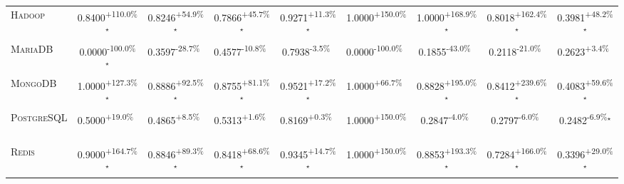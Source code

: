 \begin{table}[htbp]
\begin{tabular}{l|cccc|cccc}
\textsc{Hadoop} & \cellcolor{green!30}0.8400\textsuperscript{+110.0\%}$^\star$ & \cellcolor{green!30}0.8246\textsuperscript{+54.9\%}$^\star$ & \cellcolor{green!30}0.7866\textsuperscript{+45.7\%}$^\star$ & \cellcolor{green!30}0.9271\textsuperscript{+11.3\%}$^\star$ & \cellcolor{green!30}1.0000\textsuperscript{+150.0\%}$^{\,\,\,}$ & \cellcolor{green!30}1.0000\textsuperscript{+168.9\%}$^\star$ & \cellcolor{green!30}0.8018\textsuperscript{+162.4\%}$^\star$ & \cellcolor{green!30}0.3981\textsuperscript{+48.2\%}$^\star$ \\
\textsc{MariaDB} & \cellcolor{red!30}0.0000\textsuperscript{-100.0\%}$^\star$ & \cellcolor{red!30}0.3597\textsuperscript{-28.7\%}$^{\,\,\,}$ & \cellcolor{red!30}0.4577\textsuperscript{-10.8\%}$^{\,\,\,}$ & \cellcolor{red!30}0.7938\textsuperscript{-3.5\%}$^{\,\,\,}$ & \cellcolor{red!30}0.0000\textsuperscript{-100.0\%}$^{\,\,\,}$ & \cellcolor{red!30}0.1855\textsuperscript{-43.0\%}$^{\,\,\,}$ & \cellcolor{red!30}0.2118\textsuperscript{-21.0\%}$^{\,\,\,}$ & \cellcolor{green!30}0.2623\textsuperscript{+3.4\%}$^{\,\,\,}$ \\
\textsc{MongoDB} & \cellcolor{green!30}1.0000\textsuperscript{+127.3\%}$^\star$ & \cellcolor{green!30}0.8886\textsuperscript{+92.5\%}$^\star$ & \cellcolor{green!30}0.8755\textsuperscript{+81.1\%}$^\star$ & \cellcolor{green!30}0.9521\textsuperscript{+17.2\%}$^\star$ & \cellcolor{green!30}1.0000\textsuperscript{+66.7\%}$^{\,\,\,}$ & \cellcolor{green!30}0.8828\textsuperscript{+195.0\%}$^\star$ & \cellcolor{green!30}0.8412\textsuperscript{+239.6\%}$^\star$ & \cellcolor{green!30}0.4083\textsuperscript{+59.6\%}$^\star$ \\
\textsc{PostgreSQL} & \cellcolor{green!30}0.5000\textsuperscript{+19.0\%}$^{\,\,\,}$ & \cellcolor{green!30}0.4865\textsuperscript{+8.5\%}$^{\,\,\,}$ & \cellcolor{green!30}0.5313\textsuperscript{+1.6\%}$^{\,\,\,}$ & \cellcolor{green!30}0.8169\textsuperscript{+0.3\%}$^{\,\,\,}$ & \cellcolor{green!30}1.0000\textsuperscript{+150.0\%}$^{\,\,\,}$ & \cellcolor{red!30}0.2847\textsuperscript{-4.0\%}$^{\,\,\,}$ & \cellcolor{red!30}0.2797\textsuperscript{-6.0\%}$^{\,\,\,}$ & \cellcolor{red!30}0.2482\textsuperscript{-6.9\%}$^\star$ \\
\textsc{Redis} & \cellcolor{green!30}0.9000\textsuperscript{+164.7\%}$^\star$ & \cellcolor{green!30}0.8846\textsuperscript{+89.3\%}$^\star$ & \cellcolor{green!30}0.8418\textsuperscript{+68.6\%}$^\star$ & \cellcolor{green!30}0.9345\textsuperscript{+14.7\%}$^\star$ & \cellcolor{green!30}1.0000\textsuperscript{+150.0\%}$^{\,\,\,}$ & \cellcolor{green!30}0.8853\textsuperscript{+193.3\%}$^\star$ & \cellcolor{green!30}0.7284\textsuperscript{+166.0\%}$^\star$ & \cellcolor{green!30}0.3396\textsuperscript{+29.0\%}$^\star$ \\

\end{tabular}
\end{table}
